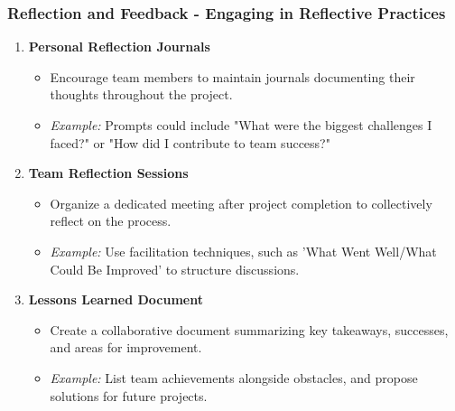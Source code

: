 \documentclass{beamer}
\begin{document}
\begin{frame}[fragile]
    \frametitle{Reflection and Feedback - Engaging in Reflective Practices}
    \begin{enumerate}
        \item \textbf{Personal Reflection Journals}
            \begin{itemize}
                \item Encourage team members to maintain journals documenting their thoughts throughout the project.
                \item \textit{Example:} Prompts could include "What were the biggest challenges I faced?" or "How did I contribute to team success?"
            \end{itemize}
        \item \textbf{Team Reflection Sessions}
            \begin{itemize}
                \item Organize a dedicated meeting after project completion to collectively reflect on the process.
                \item \textit{Example:} Use facilitation techniques, such as 'What Went Well/What Could Be Improved' to structure discussions.
            \end{itemize}
        \item \textbf{Lessons Learned Document}
            \begin{itemize}
                \item Create a collaborative document summarizing key takeaways, successes, and areas for improvement.
                \item \textit{Example:} List team achievements alongside obstacles, and propose solutions for future projects.
            \end{itemize}
    \end{enumerate}
\end{frame}
\end{document}
